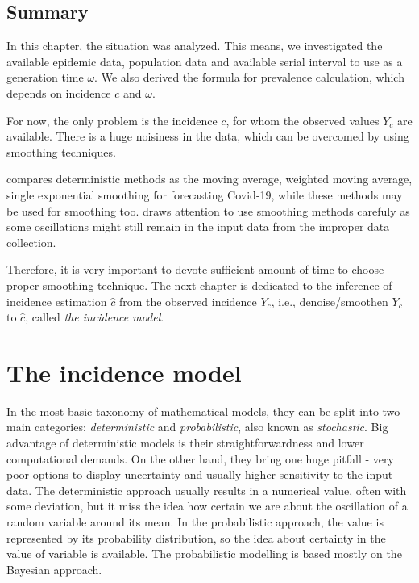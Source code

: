 \documentclass[
  digital, %
  oneside, %
  lof,     %
  lot,     %
]{fithesis4}
\begin{document}

\section{Summary}

In this chapter, the situation was analyzed.
This means, we investigated the available
epidemic data, population data and available
serial interval to use as a generation time $\omega$.
We also derived the formula for prevalence calculation,
which depends on incidence $c$ and $\omega$.

For now, the only problem is the incidence $c$,
for whom the observed values $Y_c$ are available.
There is a huge noisiness in the data, which can be overcomed by using 
smoothing techniques.

\cite{elmousalami2020} compares deterministic
methods as the moving average, weighted 
moving average, single exponential smoothing for 
forecasting Covid-19, while these methods may be used 
for smoothing too. \cite{annunziato2020} draws attention to use smoothing 
methods carefuly as some oscillations might still remain in 
the input data from the improper data collection.

Therefore, it is very important to devote sufficient
amount of time to choose proper smoothing technique.
The next chapter is dedicated to the inference of
incidence estimation $\hat{c}$ from the observed 
incidence $Y_c$, i.e., denoise/smoothen $Y_c$ to $\hat{c}$, called
\textit{the incidence model}.


\chapter{The incidence model}

In the most basic taxonomy of mathematical models, they can be 
split into two main categories: \textit{deterministic} and 
\textit{probabilistic}, also known as \textit{stochastic}. 
Big advantage of deterministic models is their 
straightforwardness and lower computational demands. 
On the other hand, they bring one huge pitfall - very 
poor options to display uncertainty and usually higher 
sensitivity to the input data. 
The deterministic approach usually results in a numerical 
value, often with some deviation, but it miss the idea 
how certain we are about the oscillation of a random 
variable around its mean. 
In the probabilistic approach, the value is represented 
by its probability distribution, so the idea about 
certainty in the value of variable is available. 
The probabilistic modelling is based mostly
on the Bayesian approach.
\end{document}

